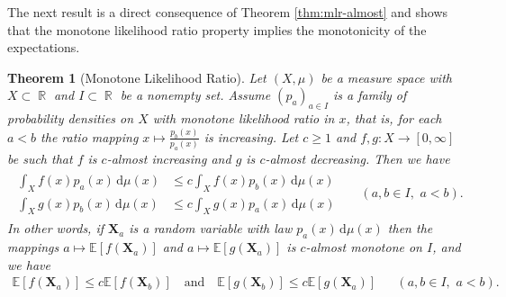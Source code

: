 \documentclass[12pt, reqno]{amsart}%
\theoremstyle{plain}  %
\newtheorem{theorem}{Theorem}[section]
\theoremstyle{definition}  %
\theoremstyle{remark}
\numberwithin{equation}{section}
\DeclareMathOperator{\R}{\mathbb{R}}
\renewcommand{\d}{\,\mathrm{d}}
\begin{document}
The next result is a direct consequence of Theorem \ref{thm:mlr-almost} and shows that the monotone likelihood ratio property implies the  monotonicity of the expectations. 
\begin{theorem}[Monotone Likelihood Ratio]
\label{thm:mon-like-ratio} Let $(X, \mu)$ be a measure space with $X\subset \R$ and $I\subset \R$ be a  nonempty set. Assume $(p_a)_{a\in I}$ is a family of probability densities on $X$ with monotone likelihood ratio in $x$, that is,  for each $a<b$ the ratio mapping $x\mapsto \frac{p_b(x)}{p_a(x)} $ is increasing.
Let $c\geq1$ and $f ,g: X\to [0,\infty]$ be such that $f$ is $c$-almost increasing and $g$ is $c$-almost decreasing. Then we have
\begin{align*}
 \begin{split}
\int_X f(x) p_a(x)\d \mu(x)&\leq c\int_X f(x) p_b(x)\d \mu(x)\\
\int_X g(x) p_b(x)\d \mu(x)&\leq c\int_X g(x) p_a(x)\d \mu(x)
\end{split} && (a,b\in I,\,\, a<b).
\end{align*}
In other words,  if $\mathbf{X}_a$ is a random variable with law $p_a(x)\d \mu(x)$ then  the mappings $a\mapsto \mathbb{E}[f(\mathbf{X}_a)]$  and $a\mapsto \mathbb{E}[g(\mathbf{X}_a)]$ is $c$-almost monotone on $I$, and we have
\begin{align*}
\mathbb{E}[f(\mathbf{X}_a)]\leq c\mathbb{E}[f(\mathbf{X}_b)]\quad\text{and}\quad  \mathbb{E}[g(\mathbf{X}_b)]\leq c\mathbb{E}[g(\mathbf{X}_a)] && (a,b\in I,\,\,a<b).
\end{align*}
\end{theorem}
\end{document}
